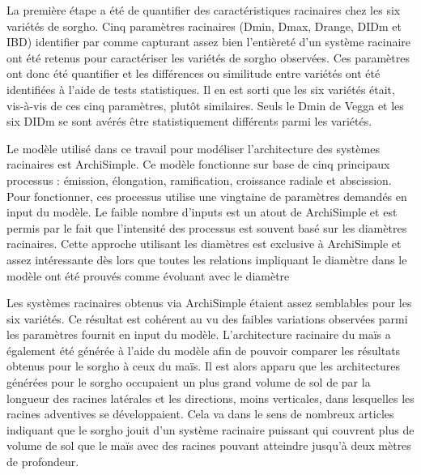 La première étape a été de quantifier des caractéristiques racinaires chez les six variétés de sorgho.
Cinq paramètres racinaires (Dmin, Dmax, Drange, DIDm et IBD) identifier par \cite{pages_seeking_2018} comme capturant assez bien l'entièreté d'un système racinaire ont été retenus pour caractériser les variétés de sorgho observées.
Ces paramètres ont donc été quantifier et les différences ou similitude entre variétés ont été identifiées à l'aide de tests statistiques.
Il en est sorti que les six variétés était, vis-à-vis de ces cinq paramètres, plutôt similaires.
Seuls le Dmin de Vegga et les six DIDm se sont avérés être statistiquement différents parmi les variétés.
\newline

Le modèle utilisé dans ce travail pour modéliser l'architecture des systèmes racinaires est ArchiSimple.
Ce modèle fonctionne sur base de cinq principaux processus : émission, élongation, ramification, croissance radiale et abscission.
Pour fonctionner, ces processus utilise une vingtaine de paramètres demandés en input du modèle.
Le faible nombre d'inputs est un atout de ArchiSimple et est permis par le fait que l'intensité des processus est souvent basé sur les diamètres racinaires.
Cette approche utilisant les diamètres est exclusive à ArchiSimple et assez intéressante dès lors que toutes les relations impliquant le diamètre dans le modèle ont été prouvés comme évoluant avec le diamètre
\newline

Les systèmes racinaires obtenus via ArchiSimple étaient assez semblables pour les six variétés.
Ce résultat est cohérent au vu des faibles variations observées parmi les paramètres fournit en input du modèle.
L'architecture racinaire du maïs a également été générée à l'aide du modèle afin de pouvoir comparer les résultats obtenus pour le sorgho à ceux du maïs.
Il est alors apparu que les architectures générées pour le sorgho occupaient un plus grand volume de sol de par la longueur des racines latérales et les directions, moins verticales, dans lesquelles les racines adventives se développaient.
Cela va dans le sens de nombreux articles indiquant que le sorgho jouit d'un système racinaire puissant qui couvrent plus de volume de sol que le maïs avec des racines pouvant atteindre jusqu'à deux mètres de profondeur.
\newline

